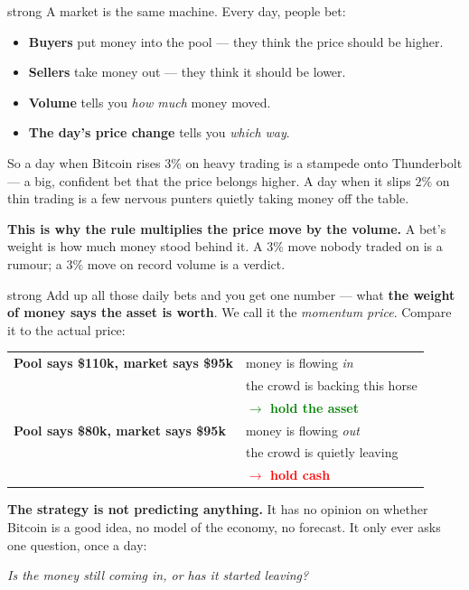 \documentclass[12pt,a4paper]{article}
\begin{document}
\begin{kbox}{strong}
A market is the same machine. Every day, people bet:

\vspace{0.4em}
\begin{itemize}[leftmargin=1.6em, topsep=1pt, itemsep=3pt]
    \item \textbf{Buyers} put money into the pool --- they think the
          price should be higher.
    \item \textbf{Sellers} take money out --- they think it should be
          lower.
    \item \textbf{Volume} tells you \emph{how much} money moved.
    \item \textbf{The day's price change} tells you \emph{which way}.
\end{itemize}

\vspace{0.5em}
So a day when Bitcoin rises $3\%$ on heavy trading is a stampede onto
Thunderbolt --- a big, confident bet that the price belongs higher. A
day when it slips $2\%$ on thin trading is a few nervous punters
quietly taking money off the table.

\vspace{0.5em}
\textbf{This is why the rule multiplies the price move by the volume.}
A bet's weight is how much money stood behind it. A $3\%$ move nobody
traded on is a rumour; a $3\%$ move on record volume is a verdict.
\end{kbox}

\begin{kbox}{strong}
Add up all those daily bets and you get one number --- what \textbf{the
weight of money says the asset is worth}. We call it the
\emph{momentum price}. Compare it to the actual price:

\vspace{0.6em}
\centering
\begin{tabular}{@{}ll@{}}
    \toprule
    \textbf{Pool says \$110k, market says \$95k} & money is flowing
    \emph{in} \\
    & the crowd is backing this horse \\
    & \textcolor{green}{\textbf{$\rightarrow$ hold the asset}} \\
    \midrule
    \textbf{Pool says \$80k, market says \$95k} & money is flowing
    \emph{out} \\
    & the crowd is quietly leaving \\
    & \textcolor{red}{\textbf{$\rightarrow$ hold cash}} \\
    \bottomrule
\end{tabular}

\vspace{0.7em}
\raggedright
\textbf{The strategy is not predicting anything.} It has no opinion on
whether Bitcoin is a good idea, no model of the economy, no forecast.
It only ever asks one question, once a day:

\vspace{0.4em}
\centering\itshape
Is the money still coming in, or has it started leaving?
\end{kbox}
\end{document}

